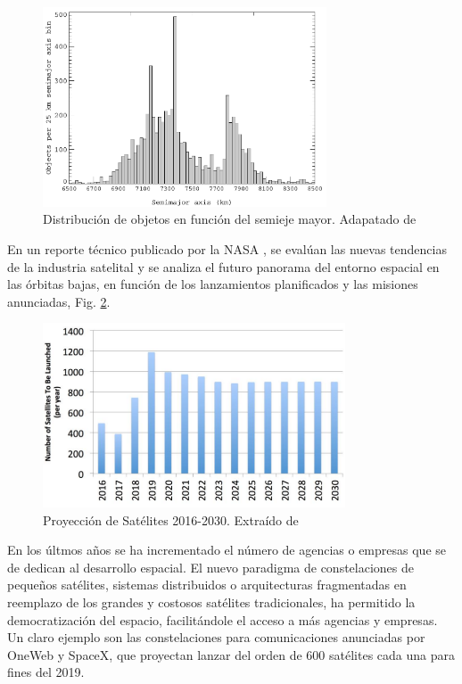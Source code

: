 \begin{figure}[!h]
  \centering
  \includegraphics[width=0.75\textwidth]{imagenes/SDvsaltura2011}
  \caption[Distribuci\'on de objetos en funci\'on del semieje mayor.]{Distribuci\'on de objetos en funci\'on del semieje mayor. Adapatado de \citep{Klinkrad}}
  \label{fig:Dvsaltura}
\end{figure}

En un reporte t\'ecnico publicado por la NASA \citep{karacalioglu2016impact}, se eval\'uan las nuevas tendencias de la industria satelital y se analiza el futuro panorama del entorno espacial en las \'orbitas bajas, en funci\'on de los lanzamientos planificados y las misiones anunciadas, Fig. \ref{fig:satxlanz}.\\

\begin{figure}[!h]
  \centering
  \includegraphics[width=0.8\textwidth]{imagenes/satelxlanz}
  \caption[Proyecci\'on de Sat\'elites 2016-2030]{Proyecci\'on de Sat\'elites 2016-2030. Extra\'ido de \citep{karacalioglu2016impact}}
  \label{fig:satxlanz}
\end{figure}

En los \'ultmos a\~nos se ha incrementado el n\'umero de agencias o empresas que se de dedican al desarrollo espacial. El nuevo paradigma de constelaciones de peque\~nos sat\'elites, sistemas distribuidos o arquitecturas fragmentadas en reemplazo de los grandes y costosos sat\'elites tradicionales, ha permitido la democratizaci\'on del espacio, facilit\'andole el acceso a m\'as agencias y empresas.\\ 
Un claro ejemplo son las constelaciones para comunicaciones anunciadas por OneWeb y SpaceX, que proyectan lanzar del orden de 600 sat\'elites cada una para fines del 2019.\\

